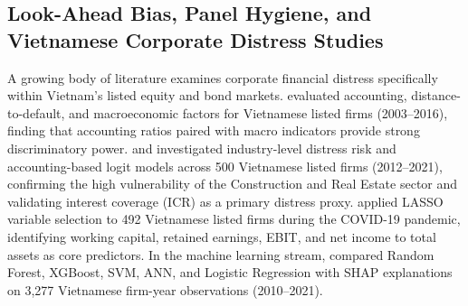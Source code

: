\documentclass[pdflatex,sn-mathphys-num,twocolumn]{sn-jnl}
\theoremstyle{thmstyleone}
\theoremstyle{thmstyletwo}
\theoremstyle{thmstylethree}
\begin{document}
\subsection{Look-Ahead Bias, Panel Hygiene, and Vietnamese Corporate Distress Studies}
A growing body of literature examines corporate financial distress specifically within Vietnam's listed equity and bond markets. \citet{pham2018financial} evaluated accounting, distance-to-default, and macroeconomic factors for Vietnamese listed firms (2003--2016), finding that accounting ratios paired with macro indicators provide strong discriminatory power. \citet{vo2019corporate} and \citet{tran2023examining} investigated industry-level distress risk and accounting-based logit models across 500 Vietnamese listed firms (2012--2021), confirming the high vulnerability of the Construction and Real Estate sector and validating interest coverage ($\text{ICR}$) as a primary distress proxy. \citet{vu2023lasso} applied LASSO variable selection to 492 Vietnamese listed firms during the COVID-19 pandemic, identifying working capital, retained earnings, EBIT, and net income to total assets as core predictors. In the machine learning stream, \citet{tran2022explainable} compared Random Forest, XGBoost, SVM, ANN, and Logistic Regression with SHAP explanations on 3,277 Vietnamese firm-year observations (2010--2021).
\end{document}
